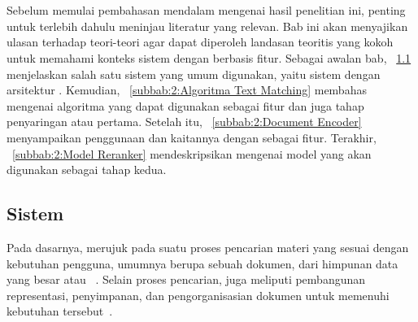 \chapter{\babDua}
\label{bab:2}
Sebelum memulai pembahasan mendalam mengenai hasil penelitian ini, penting untuk terlebih dahulu meninjau literatur yang relevan. Bab ini akan menyajikan ulasan terhadap teori-teori agar dapat diperoleh landasan teoritis yang kokoh untuk memahami konteks sistem \ir{} dengan \reranker{} berbasis fitur. Sebagai awalan bab, \subbab{}~\ref{subbab:2:Sistem Information Retrieval} menjelaskan salah satu sistem \ir{} yang umum digunakan, yaitu sistem dengan arsitektur \cascaded{}. Kemudian, \subbab{}~\ref{subbab:2:Algoritma Text Matching} membahas mengenai algoritma yang dapat digunakan sebagai fitur dan juga tahap penyaringan atau \ranking{} pertama. Setelah itu, \subbab{}~\ref{subbab:2:Document Encoder} menyampaikan penggunaan \encoder{} dan kaitannya dengan \ir{} sebagai fitur. Terakhir, \subbab{}~\ref{subbab:2:Model Reranker} mendeskripsikan mengenai model \reranker{} yang akan digunakan sebagai tahap \ranking{} kedua.





\section{Sistem \ir{}}
\label{subbab:2:Sistem Information Retrieval}
Pada dasarnya, \ir{} merujuk pada suatu proses pencarian materi yang sesuai dengan kebutuhan pengguna, umumnya berupa sebuah dokumen, dari himpunan data yang besar atau \corpus{}~\citep{schutze2008introduction}. Selain proses pencarian, \ir{} juga meliputi pembangunan representasi, penyimpanan, dan pengorganisasian dokumen untuk memenuhi kebutuhan tersebut~\citep{baeza1999modern}.

